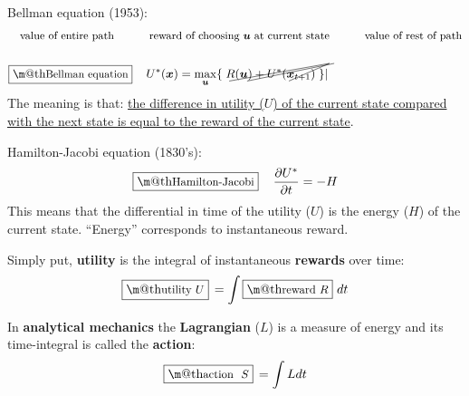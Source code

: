 \documentclass[orivec]{llncs}
\makeatletter
\newcommand{\emp}[1]{\textbf{#1}}
\newcommand{\tikzmark}[1]{\tikz[overlay,remember picture] \node (#1) {};}
\newcommand{\vect}[1]{\boldsymbol{#1}}
\renewcommand{\boxed}[1]{\fbox{\m@th$\displaystyle\scalebox{0.9}{#1}$} \,}
\makeatother
\begin{document}
Bellman equation (1953):
\begin{eqnarray}
& \mbox{\footnotesize value of entire path} \tikzmark{uEntire} \quad \quad \mbox{\footnotesize reward of choosing $\vect{u}$ at current state} \tikzmark{rCurrent} \quad \quad \mbox{\footnotesize value of rest of path} \tikzmark{uRest} \nonumber \\
\nonumber \\
& \boxed{\mbox{Bellman equation}} \quad \tikzmark{UEntire} U^*(\vect{x}) = \max\limits_{\vect{u}} \{ \; \tikzmark{RCurrent} R(\vect{u}) + \tikzmark{URest} U^*(\vect{x}_{t+1}) \; \}
\begin{tikzpicture}[overlay,remember picture]
  \draw (uEntire.center) +(-30pt,-3pt) -- ([shift={(4pt,12pt)}]UEntire.center);
  \draw (rCurrent.center) +(-80pt,-3pt) -- ([shift={(4pt,12pt)}]RCurrent.center);
  \draw (uRest.center) +(-65pt,-3pt) -- ([shift={(8pt,12pt)}]URest.center);
\end{tikzpicture}
\label{Bellman-eqn}|
\end{eqnarray}
The meaning is that:  \uline{the difference in utility ($U$) of the current state compared with the next state is equal to the reward of the current state}.

Hamilton-Jacobi equation (1830's):
\begin{equation}
\boxed{\mbox{Hamilton-Jacobi}} \quad
\frac{\partial U^*}{\partial t} = - H
\label{Hamilton-Jacobi-eqn}
\end{equation}
This means that the differential in time of the utility ($U$) is the energy ($H$) of the current state.  ``Energy'' corresponds to instantaneous reward.

Simply put, \textbf{utility} is the integral of instantaneous \textbf{rewards} over time:
\begin{equation}
\boxed{\mbox{utility} $U$} = \int \boxed{\mbox{reward} $R$} \,dt
\end{equation}


In \emp{analytical mechanics} the \textbf{Lagrangian} ($L$) is a measure of energy and its time-integral is called the \textbf{action}:
\begin{equation}
\boxed{\mbox{action } $S$} = \int L dt
\end{equation}
\end{document}
